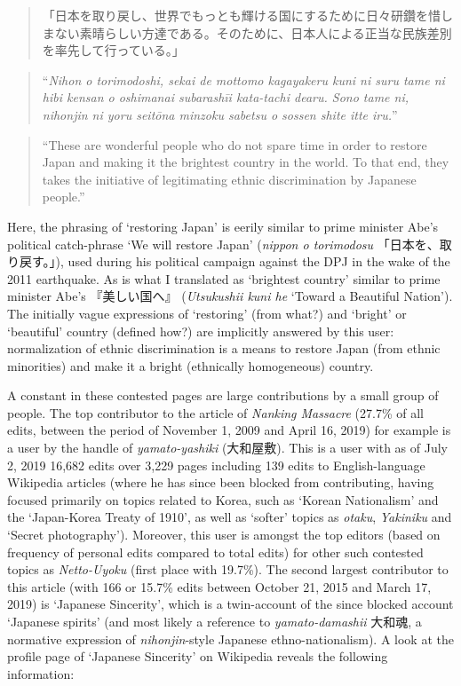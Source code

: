 \documentclass[10pt,british,A4paper,,openany]{memoir}
\begin{document}
\begin{quote}
「日本を取り戻し、世界でもっとも輝ける国にするために日々研鑽を惜しまない素晴らしい方達である。そのために、日本人による正当な民族差別を率先して行っている。」
\end{quote}

\begin{quote}
``\emph{Nihon o torimodoshi, sekai de mottomo kagayakeru kuni ni suru
tame ni hibi kensan o oshimanai subarashīi kata-tachi dearu. Sono tame
ni, nihonjin ni yoru seitōna minzoku sabetsu o sossen shite itte iru.}''
\end{quote}

\begin{quote}
``These are wonderful people who do not spare time in order to restore
Japan and making it the brightest country in the world. To that end,
they takes the initiative of legitimating ethnic discrimination by
Japanese people.''
\end{quote}

Here, the phrasing of `restoring Japan' is eerily similar to prime
minister Abe's political catch-phrase `We will restore Japan'
(\emph{nippon o torimodosu} 「日本を、取り戻す。」), used during his
political campaign against the DPJ in the wake of the 2011 earthquake.
As is what I translated as `brightest country' similar to prime minister
Abe's 『美しい国へ』 (\emph{Utsukushii kuni he} `Toward a Beautiful
Nation'). The initially vague expressions of `restoring' (from what?)
and `bright' or `beautiful' country (defined how?) are implicitly
answered by this user: normalization of ethnic discrimination is a means
to restore Japan (from ethnic minorities) and make it a bright
(ethnically homogeneous) country.

A constant in these contested pages are large contributions by a small
group of people. The top contributor to the article of \emph{Nanking
Massacre} (27.7\% of all edits, between the period of November 1, 2009
and April 16, 2019) for example is a user by the handle of
\emph{yamato-yashiki} (大和屋敷). This is a user with as of July 2, 2019
16,682 edits over 3,229 pages including 139 edits to English-language
Wikipedia articles (where he has since been blocked from contributing,
having focused primarily on topics related to Korea, such as `Korean
Nationalism' and the `Japan-Korea Treaty of 1910', as well as `softer'
topics as \emph{otaku}, \emph{Yakiniku} and `Secret photography').
Moreover, this user is amongst the top editors (based on frequency of
personal edits compared to total edits) for other such contested topics
as \emph{Netto-Uyoku} (first place with 19.7\%). The second largest
contributor to this article (with 166 or 15.7\% edits between October
21, 2015 and March 17, 2019) is `Japanese Sincerity', which is a
twin-account of the since blocked account `Japanese spirits' (and most
likely a reference to \emph{yamato-damashii} 大和魂, a normative
expression of \emph{nihonjin}-style Japanese ethno-nationalism). A look
at the profile page of `Japanese Sincerity' on Wikipedia reveals the
following information:
\end{document}
